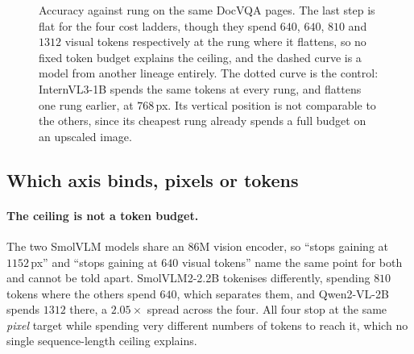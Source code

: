 \documentclass[10pt,twocolumn]{article}
\theoremstyle{plain}
\begin{document}
\begin{figure}[t]
\centering
{}
\caption{Accuracy against rung on the same DocVQA pages. The last step is flat
for the four cost ladders, though they spend $640$, $640$, $810$ and $1312$
visual tokens respectively at the rung where it flattens, so no fixed token
budget explains the ceiling, and the dashed curve is a model from another
lineage entirely. The dotted curve is the control: InternVL3-1B spends the
same tokens at every rung, and flattens one rung earlier, at $768$\,px. Its
vertical position is not comparable to the others, since its cheapest rung
already spends a full budget on an upscaled image.}
\label{fig:saturation}
\end{figure}

\subsection{Which axis binds, pixels or tokens}

\paragraph{The ceiling is not a token budget.} The two SmolVLM models share an
$86$M vision encoder, so ``stops gaining at $1152$\,px'' and ``stops gaining at
$640$ visual tokens'' name the same point for both and cannot be told apart.
SmolVLM2-2.2B tokenises differently, spending $810$ tokens where the others
spend $640$, which separates them, and Qwen2-VL-2B spends $1312$ there, a
$2.05\times$ spread across the four. All four stop at the same \emph{pixel}
target while spending very different numbers of tokens to reach it, which no
single sequence-length ceiling explains.
\end{document}
